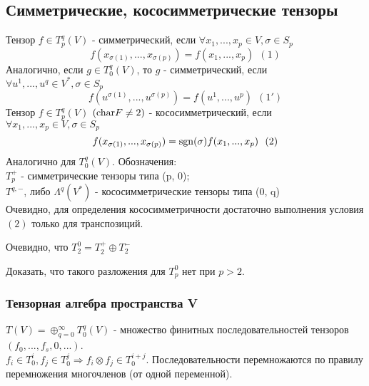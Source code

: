 \subsection{Симметрические, кососимметрические тензоры}
\begin{definition}
    Тензор $f \in T_p^q(V)$ - симметрический, если $\forall x_1,...,x_p \in V, \sigma \in S_p$
    \[f(x_{\sigma(1)},...,x_{\sigma(p)}) = f(x_1,...,x_p) \ \ (1)\]
    Аналогично, если $g \in T_0^q(V)$, то $g$ - симметрический, если $\forall u^1,...,u^q \in V^*, \sigma \in S_p$
    \[f(u^{\sigma(1)},...,u^{\sigma(p)}) = f(u^1,...,u^p) \ \ (1')\] 
    Тензор $f \in T_p^q(V)$ $(\textup{char} F \neq 2)$ - кососимметрический, если $\forall x_1,...,x_p \in V, \sigma \in S_p$
    \[f(x_{\sigma(1)},...,x_{\sigma(p)}) = \operatorname{sgn}(\sigma)f(x_1,...,x_p) \ \ (2)\]
    Аналогично для $T_0^q(V)$.
    Обозначения:\\
    $T_p^+$ - симметрические тензоры типа (p, 0);\\
    $T^{q, -}$, либо $\Lambda^q(V^*)$ - кососимметрические тензоры типа (0, q)\\
    Очевидно, для определения кососимметричности достаточно выполнения условия $(2)$ только для транспозиций.
\end{definition}
Очевидно, что $T_2^0 = T_2^+ \oplus T_2^-$
\begin{exercise}
    Доказать, что такого разложения для $T_p^0$ нет при $p > 2$.
\end{exercise}
\subsubsection*{Тензорная алгебра пространства V}
$T(V) = \oplus_{q = 0}^\infty T_0^q(V)$ - множество финитных последовательностей тензоров $(f_0,...,f_s, 0,...)$.\\
$f_i \in T_0^i, f_j \in T_0^j \Longrightarrow f_i \otimes f_j \in T_0^{i+j}$.
Последовательности перемножаются по правилу перемножения многочленов (от одной переменной).
